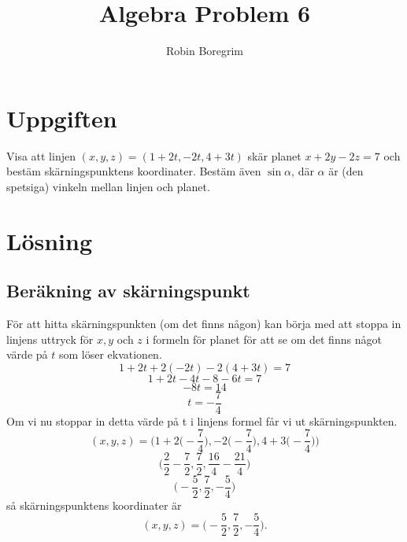 \documentclass[11pt]{article}
\begin{document}
\title{Algebra Problem 6}
\author{Robin Boregrim}
\maketitle
\renewcommand{\contentsname}{Innehållsförteckning}
\tableofcontents
\newpage
\section{Uppgiften}
Visa att linjen $(x,y,z) = (1+2t,-2t,4+3t)$ skär planet $x + 2y -2z = 7$ och bestäm skärningspunktens koordinater. Bestäm även $\sin\alpha$, där $\alpha$ är (den spetsiga) vinkeln mellan linjen och planet.
\section{Lösning}
\subsection{Beräkning av skärningspunkt}
För att hitta skärningspunkten (om det finns någon) kan börja med att stoppa in linjens uttryck för $x,y$ och $z$ i formeln för planet för att se om det finns något värde på $t$ som löser ekvationen.
  $$1+2t + 2(-2t) -2(4+3t) = 7$$
  $$1+2t - 4t -8 -6t = 7$$
  $$-8t = 14$$
  $$t = -\frac{7}{4}$$
  Om vi nu stoppar in detta värde på t i linjens formel får vi ut skärningspunkten.
  $$(x,y,z) = \Bigg(1+2\Bigg(-\frac{7}{4}\Bigg),-2\Bigg(-\frac{7}{4}\Bigg),4+3\Bigg(-\frac{7}{4}\Bigg)\Bigg)$$
  $$\Bigg(\frac{2}{2}-\frac{7}{2},\frac{7}{2},\frac{16}{4}-\frac{21}{4}\Bigg)$$
  $$\Bigg(-\frac{5}{2},\frac{7}{2},-\frac{5}{4}\Bigg)$$
  så skärningspunktens koordinater är $$(x,y,z) = \Bigg(-\frac{5}{2},\frac{7}{2},-\frac{5}{4}\Bigg).$$
\end{document}
